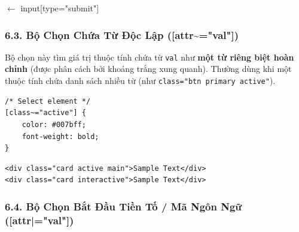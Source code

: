 \documentclass[11pt,oneside]{book}
\newcommand{\codeinline}[1]{\textcolor{accentOrange}{\texttt{#1}}}
\begin{document}
\begin{browserWindow}
\sffamily\small
{} \quad
{} \textcolor{gray!60}{\scriptsize $\leftarrow$ input[type="submit"]}
\end{browserWindow}

\subsubsection{6.3. Bộ Chọn Chứa Từ Độc Lập ([attr\textasciitilde{}="val"])}

\begin{conceptBox}
Bộ chọn này tìm giá trị thuộc tính chứa từ \codeinline{val} như \textbf{một từ riêng biệt hoàn chỉnh} (được phân cách bởi khoảng trắng xung quanh). Thường dùng khi một thuộc tính chứa danh sách nhiều từ (như \codeinline{class="btn primary active"}).
\end{conceptBox}

\begin{codeWindow}
\begin{lstlisting}[language=CSS3]
/* Select element */
[class~="active"] {
    color: #007bff;
    font-weight: bold;
}
\end{lstlisting}

\begin{lstlisting}[language=HTML5]
<div class="card active main">Sample Text</div>
<div class="card interactive">Sample Text</div>
\end{lstlisting}
\end{codeWindow}

\begin{browserWindow}
\sffamily\small
{} \quad
\tcbox[on line, arc=3pt, colback=gray!5, colframe=gray!30, boxsep=3pt]{\textcolor{darkText}{Không khớp (Class interactive)}}
\end{browserWindow}

\subsubsection{6.4. Bộ Chọn Bắt Đầu Tiền Tố / Mã Ngôn Ngữ ([attr|="val"])}
\end{document}

